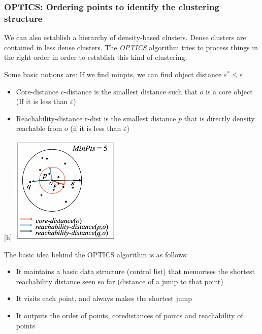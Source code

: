 \subsubsection{OPTICS: Ordering points to identify the clustering structure}
    We can also establish a hierarchy of density-based clusters. Dense clusters are contained in less dense clusters. The \emph{OPTICS} algorithm tries to process things in the right order in order to establish this kind of clustering. 
    
    Some basic notions are: If we find minpts, we can find object distance $\varepsilon^* \leq \varepsilon$
    
    \begin{itemize}
        \item Core-distance c-distance is the smallest distance such that $o$ is a core object (If it is less than $\varepsilon$)
        \item Reachability-distance r-dist is the smallest distance $p$ that is directly density reachable from $o$ (if it is less than $\varepsilon$)
    \end{itemize}
    
    
\begin{center}[h]
    \includegraphics[width=0.4\textwidth]{images/reachability.png}
\end{center}

The basic idea behind the OPTICS algorithm is as follows:
\begin{itemize}
    \item It maintains a basic data structure (control list) that memorises the shortest reachability distance seen so far (distance of a jump to that point)
    \item It visits each point, and always makes the shortest jump
    \item It outputs the order of points, coredistances of points and reachability of points
\end{itemize}

